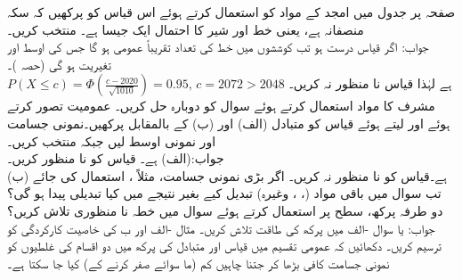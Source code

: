\quad 
صفحہ  پر جدول  میں امجد کے مواد کو استعمال کرتے ہوئے اس قیاس کو پرکھیں کہ سکہ منصفانہ ہے، یعنی خط اور شیر کا احتمال ایک جیسا ہے۔ منتخب کریں۔\\
جواب:\quad
اگر قیاس  درست ہو تب  کوششوں میں خط کی تعداد تقریباً عمومی ہو گا جس کی اوسط  اور تغیریت  ہو گی (حصہ )۔\\
$P(X\le c)=\Phi(\tfrac{c-2020}{\sqrt{1010}})=0.95,\,c=2072>2048$
ہے لہٰذا قیاس نا منظور نہ کریں۔
\quad
مشرف کا مواد استعمال کرتے ہوئے سوال  کو دوبارہ حل کریں۔
\quad
عمومیت تصور کرتے ہوئے اور  لیتے ہوئے قیاس  کو متبادل (الف)  اور (ب)  کے بالمقابل پرکھیں۔نمونی جسامت  اور نمونی اوسط  لیں جبکہ  منتخب کریں۔\\
جواب:\quad (الف)  ہے۔ قیاس کو نا منظور کریں۔\\
(ب)  ہے۔قیاس کو نا منظور نہ کریں۔
\quad
اگر بڑی نمونی جسامت، مثلاً ، استعمال کی جائے تب سوال  میں باقی مواد (، ، وغیرہ) تبدیل کیے بغیر نتیجے میں کیا تبدیلی پیدا ہو گی؟ 
\quad
دو طرفہ پرکھ،  سطح پر استعمال کرتے ہوئے سوال  میں خطہ نا منظوری تلاش کریں؟\\
جواب:\quad {} یا 
\quad
سوال -الف میں پرکھ کی طاقت تلاش کریں۔
\quad
مثال -الف اور ب کی خاصیت کارکردگی کو ترسیم کریں۔  
\quad
دکھائیں کہ عمومی تقسیم میں قیاس  اور متبادل  کی پرکھ میں  دو اقسام کی غلطیوں کو نمونی جسامت کافی بڑھا کر  جتنا چاہیں کم (ما سوائے صفر کرنے کے) کیا جا سکتا ہے۔
